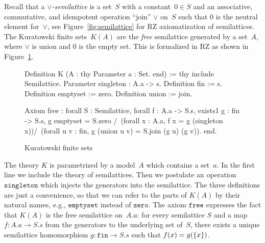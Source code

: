 Recall that a \emph{$\vee$-semilattice} is a set~$S$ with a
constant~$0 \in S$ and an associative, commutative, and idempotent
operation ``join'' $\vee$ on~$S$ such that $0$ is the neutral element
for~$\vee$, see Figure~\ref{fig:semilattice} for RZ axiomatization of
semilattices.
%
The Kuratowski finite sets~$K(A)$ are the \emph{free} semilattice
generated by a set~$A$, where $\vee$ is union and $0$ is the empty
set. This is formalized in RZ as shown in Figure~\ref{fig:kuratowski}.
%
\begin{figure}
\centering
\begin{source}
Definition K (A : thy  Parameter a : Set.  end) :=
thy
  include Semilattice.
  Parameter singleton : A.a -> s.
  Definition fin := s.
  Definition emptyset := zero.
  Definition union := join.

  Axiom free :
    forall S : Semilattice, forall f : A.a -> S.s,
    exists1 g : fin -> S.s, 
      g emptyset = S.zero /\
        (forall x : A.a, f x = g (singleton x))/\
        (forall u v : fin, g (union u v) = S.join (g u) (g v)).
end.
\end{source}
  \caption{Kuratowski finite sets}
  \label{fig:kuratowski}
\end{figure}
%
The theory $K$ is parametrized by a model~$A$ which contains a
set~$a$. In the first line we include the theory of semilattices. Then
we postulate an operation $\mathtt{singleton}$ which injects the
generators into the semilattice. The three definitions are just a
convenience, so that we can refer to the parts of $K(A)$ by their
natural names, e.g., $\mathtt{emptyset}$ instead of $\mathtt{zero}$.
The axiom $\mathtt{free}$ expresses the fact that $K(A)$ is the free
semilattice on~$A.a$: for every semilattice $S$ and a map $f : A.a \to
S.s$ from the generators to the underlying set of~$S$, there exists a
unique semilattice homomorphism $g : \mathtt{fin} \to S.s$ such that
$f(x) = g(\{x\})$.

